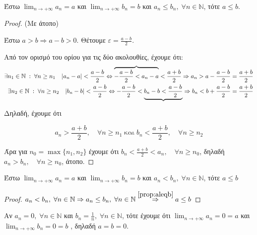 \begin{mybox3}
  \begin{prop}\label{prop:aleqb}
    Έστω $ \lim_{n \to +\infty} a_{n} = a $ και $ 
    \lim_{n \to +\infty} b_{n} = b $ και
    $ a_{n} \leq b_{n}, \; \forall n \in \mathbb{N} $, τότε $ a \leq b $.
  \end{prop}
\end{mybox3}
\begin{proof}(Με άτοπο)
\item {}
  Έστω $ a>b \Rightarrow a-b>0 $. Θέτουμε $ \varepsilon = 
  \frac{a-b}{2} $.

  Από τον ορισμό του ορίου για τις δύο ακολουθίες, έχουμε ότι:
  \begin{align*}
    \exists n_{1} \in \mathbb{N} \; : \; \forall n \geq n_{1} 
    \quad \abs{a_{n}-a} < \frac{a-b}{2} \Leftrightarrow 
    \overbrace{- \frac{a-b}{2} < a_{n} - a} < \frac{a+b}{2} \Rightarrow a_{n} > a -
    \frac{a-b}{2} = \frac{a+b}{2} \\
    \exists n_{2} \in \mathbb{N} \; : \; \forall n \geq n_{2} 
    \quad \abs{b_{n}-b} < \frac{a-b}{2} \Leftrightarrow 
    - \frac{a-b}{2} < \underbrace{b_{n} - b < \frac{a-b}{2}} \Rightarrow b_{n} < b +
    \frac{a-b}{2} = \frac{a+b}{2} 
  \end{align*}

  Δηλαδή, έχουμε ότι

  \[ a_{n} >  \frac{a+b}{2}, \quad \forall n \geq n_{1} \; \text{και} \;  
  b_{n} <  \frac{a+b}{2}, \quad \forall n \geq n_{2}  \]

  Άρα για $ n_{0} = \max \{ n_{1}, n_{2} \} $ έχουμε ότι 
  $ b_{n} < \frac{a+b}{2} < a_{n}, \quad \forall n \geq n_{0} $, 
  δηλαδή $a_{n} > b_{n}, \quad \forall n \geq n_{0} $, άτοπο.
\end{proof}

\begin{mybox3}
  \begin{prop}
    Έστω $ \lim_{n \to +\infty} a_{n} = a $ και $ \lim_{n \to +\infty} 
    b_{n} = b $ και 
    $ a_{n} < b_{n}, \; \forall n \in \mathbb{N} $, τότε $ a \leq b $ 
  \end{prop}
\end{mybox3}
\begin{proof}
  $ a_{n}< b_{n}, \; \forall n \in \mathbb{N} \Rightarrow a_{n} \leq 
  b_{n}, \; \forall n \in \mathbb{N} \overset{\ref{prop:aleqb}}{\Rightarrow} 
  a \leq b $
\end{proof}

\begin{example}
\item {}
  Αν $ a_{n}=0, \; \forall n \in \mathbb{N} $
  και $ b_{n}= \frac{1}{n}, \; \forall n \in \mathbb{N} $, τότε έχουμε ότι 
  $ \lim_{n \to +\infty} a_{n} = 0 = a $ και 
  $ \lim_{n \to +\infty} b_{n} =  0 = b $ , δηλαδή $ a=b=0  $.
\end{example}


